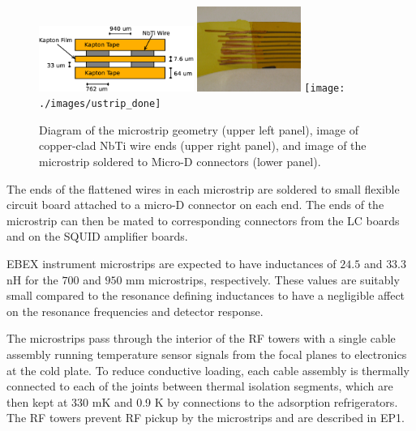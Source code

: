 \documentclass[../EBEXPaper2.tex]{subfiles}
\begin{document}
\begin{figure}[t]
  \centering
    \includegraphics[width=0.45\textwidth]{./images/ustrip}
    \includegraphics[width=0.3\textwidth]{./images/ustrip_end}
    \texttt{[image: ./images/ustrip\_done]}
  \caption{Diagram of the microstrip geometry (upper left panel), image of copper-clad NbTi wire ends (upper right panel), and image of the microstrip soldered to Micro-D connectors (lower panel).}
  \label{fig:ustrip}
\end{figure}

The ends of the flattened wires in each microstrip are soldered to small flexible circuit board attached to a micro-D connector on each end.
The ends of the microstrip can then be mated to corresponding connectors from the LC boards and on the \ac{SQUID} amplifier boards.

\ac{EBEX} instrument microstrips are expected to have inductances of $24.5$ and $33.3$ nH for the $700$ and $950$ mm microstrips, respectively. These values are suitably small compared to the resonance defining inductances to have a negligible affect on the resonance frequencies and detector response.

The microstrips pass through the interior of the RF towers with a single cable assembly running temperature sensor signals from the focal planes to electronics at the cold plate.
To reduce conductive loading, each cable assembly is thermally connected to each of the joints between thermal isolation segments, which are then kept at 330 mK and 0.9 K by connections to the adsorption refrigerators.
The RF towers prevent RF pickup by the microstrips and are described in \ac{EP1}.
\end{document}
